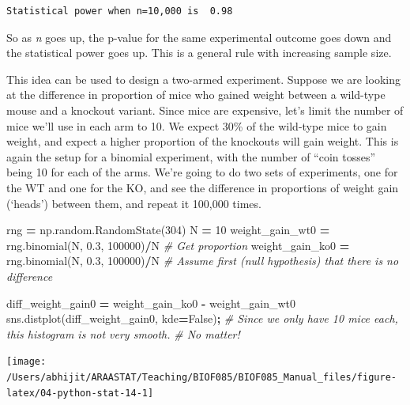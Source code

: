 \documentclass[
  letterpaper,
]{scrbook}
\newenvironment{Shaded}{\begin{snugshade}}{\end{snugshade}}
\newcommand{\CommentTok}[1]{\textcolor[rgb]{0.56,0.35,0.01}{\textit{#1}}}
\newcommand{\DecValTok}[1]{\textcolor[rgb]{0.00,0.00,0.81}{#1}}
\newcommand{\FloatTok}[1]{\textcolor[rgb]{0.00,0.00,0.81}{#1}}
\newcommand{\NormalTok}[1]{#1}
\newcommand{\OperatorTok}[1]{\textcolor[rgb]{0.81,0.36,0.00}{\textbf{#1}}}
\newcommand{\VariableTok}[1]{\textcolor[rgb]{0.00,0.00,0.00}{#1}}
\begin{document}
\begin{verbatim}
Statistical power when n=10,000 is  0.98
\end{verbatim}

So as \emph{n} goes up, the p-value for the same experimental outcome goes down and the statistical power goes up. This is a general rule with increasing sample size.

This idea can be used to design a two-armed experiment. Suppose we are looking at the difference in proportion of mice who gained weight between a wild-type mouse and a knockout variant. Since mice are expensive, let's limit the number of mice we'll use in each arm to 10. We expect 30\% of the wild-type mice to gain weight, and expect a higher proportion of the knockouts will gain weight. This is again the setup for a binomial experiment, with the number of ``coin tosses'' being 10 for each of the arms. We're going to do two sets of experiments, one for the WT and one for the KO, and see the difference in proportions of weight gain (`heads') between them, and repeat it 100,000 times.

\begin{Shaded}
\begin{Highlighting}[]
\NormalTok{rng }\OperatorTok{=}\NormalTok{ np.random.RandomState(}\DecValTok{304}\NormalTok{)}
\NormalTok{N }\OperatorTok{=} \DecValTok{10}
\NormalTok{weight_gain_wt0 }\OperatorTok{=}\NormalTok{ rng.binomial(N, }\FloatTok{0.3}\NormalTok{, }\DecValTok{100000}\NormalTok{)}\OperatorTok{/}\NormalTok{N }\CommentTok{# Get proportion}
\NormalTok{weight_gain_ko0 }\OperatorTok{=}\NormalTok{ rng.binomial(N, }\FloatTok{0.3}\NormalTok{, }\DecValTok{100000}\NormalTok{)}\OperatorTok{/}\NormalTok{N }\CommentTok{# Assume first (null hypothesis) that there is no difference}

\NormalTok{diff_weight_gain0 }\OperatorTok{=}\NormalTok{ weight_gain_ko0 }\OperatorTok{-}\NormalTok{ weight_gain_wt0}
\NormalTok{sns.distplot(diff_weight_gain0, kde}\OperatorTok{=}\VariableTok{False}\NormalTok{)}\OperatorTok{;} \CommentTok{# Since we only have 10 mice each, this histogram is not very smooth. }
                                           \CommentTok{# No matter!}
\end{Highlighting}
\end{Shaded}

\begin{center}\texttt{[image: /Users/abhijit/ARAASTAT/Teaching/BIOF085/BIOF085\_Manual\_files/figure-latex/04-python-stat-14-1]} \end{center}
\end{document}

